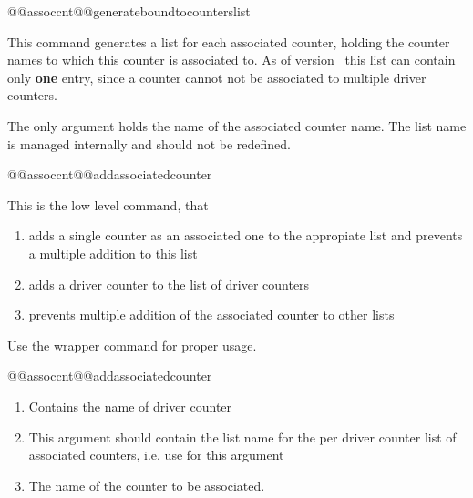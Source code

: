 \documentclass[12pt,paper=a4]{article}
\def\packageversion{\assoccntpackageversion}%
\begin{document}
\begin{docCommand}{@@assoccnt@@generateboundtocounterslist}{}

This command generates a list for each associated counter, holding the counter names to which this counter is associated to. As of version \packageversion~this list can contain only \textbf{one} entry, since a counter cannot not be associated to multiple driver counters.  

The only argument  holds the name of the associated counter name. The list name is managed internally and should not be redefined. 

\makeatletter
\begin{dispExample}
%
\end{dispExample}%
\makeatother

\end{docCommand}%


\begin{docCommand}{@@assoccnt@@addassociatedcounter}{}

This is the low level command, that 
\begin{enumerate}
  \item adds a single counter as an associated one to the appropiate list and prevents a multiple addition to this list 
  \item adds a driver counter to the list of driver counters
  \item prevents multiple addition of the associated counter to other lists
\end{enumerate}

Use the wrapper command  for proper usage. 

\begin{docCommandArgs}{@@assoccnt@@addassociatedcounter}%
\begin{enumerate}[label={\textcolor{blue}{\#\arabic*}}]
\item {}

  Contains the name of driver counter

\item {}

  This argument should contain the list name for the per driver counter list of associated counters, i.e. use  for this argument

\item {}
  
  The name of the counter to be associated. 

\end{enumerate}
\end{docCommandArgs}

\end{docCommand}
\end{document}
